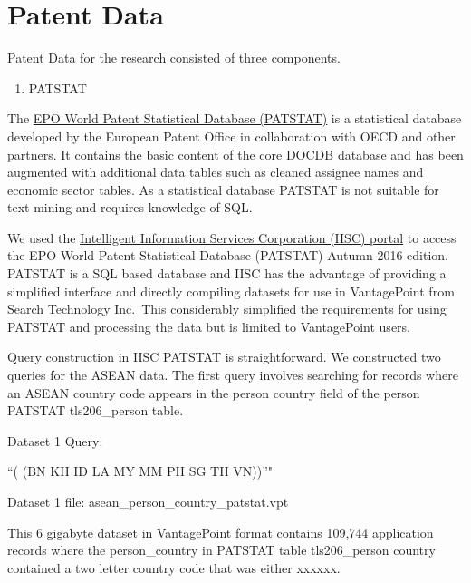 \documentclass[]{book}
\providecommand{\tightlist}{%
  \setlength{\itemsep}{0pt}\setlength{\parskip}{0pt}}
\theoremstyle{definition}
\theoremstyle{definition}
\theoremstyle{definition}
\theoremstyle{remark}
\begin{document}
\hypertarget{patent-data}{%
\section{Patent Data}\label{patent-data}}

Patent Data for the research consisted of three components.

\begin{enumerate}
\def\labelenumi{\arabic{enumi}.}
\tightlist
\item
  PATSTAT
\end{enumerate}

The
\href{https://www.epo.org/searching-for-patents/business/patstat.html\#tab-1}{EPO
World Patent Statistical Database (PATSTAT)} is a statistical database
developed by the European Patent Office in collaboration with OECD and
other partners. It contains the basic content of the core DOCDB database
and has been augmented with additional data tables such as cleaned
assignee names and economic sector tables. As a statistical database
PATSTAT is not suitable for text mining and requires knowledge of SQL.

We used the
\href{http://www.patstat.org/Patstat/PatstatApp/app/index.html\#/disclaimer}{Intelligent
Information Services Corporation (IISC) portal} to access the EPO World
Patent Statistical Database (PATSTAT) Autumn 2016 edition. PATSTAT is a
SQL based database and IISC has the advantage of providing a simplified
interface and directly compiling datasets for use in VantagePoint from
Search Technology Inc.~This considerably simplified the requirements for
using PATSTAT and processing the data but is limited to VantagePoint
users.

Query construction in IISC PATSTAT is straightforward. We constructed
two queries for the ASEAN data. The first query involves searching for
records where an ASEAN country code appears in the person country field
of the person PATSTAT tls206\_person table.

Dataset 1 Query:

``(\citet{PersonCountry} (BN \textbar{} KH \textbar{} ID \textbar{} LA
\textbar{} MY \textbar{} MM \textbar{} PH \textbar{} SG \textbar{} TH
\textbar{} VN))''"

Dataset 1 file: asean\_person\_country\_patstat.vpt

This 6 gigabyte dataset in VantagePoint format contains 109,744
application records where the person\_country in PATSTAT table
tls206\_person country contained a two letter country code that was
either xxxxxx.
\end{document}
